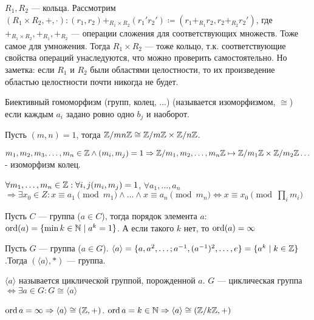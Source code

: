 \begin{definition}
	$R_1, R_2$ --- кольца. Рассмотрим  $(R_1 \times R_2, +, \cdot): (r_1, r_2) +_{R_1\times R_2} (r_1'r_2') \coloneqq (r_1+_{R_1}r_2, r_2+_{R_2}r_2')$, где $+_{R_1\times R_2}, +_{R_1}, +_{R_2}$ --- операции сложения для соответствующих множеств. Тоже самое для умножения. Тогда $R_1 \times R_2$ --- тоже кольцо, т.к. соответствующие свойства операций унаследуются, что можно проверить самостоятельно. Но заметка: если $R_1$ и $R_2$ были областями целостности, то их произведение областью целостности почти никогда не будет.
\end{definition}
\begin{definition}
    Биективный гомоморфизм (групп, колец, ...) (называется изоморфизмом, $\cong$) если каждым $a_i$ задано ровно одно  $b_j$ и наоборот.
\end{definition}
\begin{theorem}
    Пусть $(m, n)=1$, тогда $\mathbb{Z} / mn \mathbb{Z} \cong \mathbb{Z} / m\mathbb{Z} \times \mathbb{Z} / n \mathbb{Z}$.
\end{theorem}
\begin{theorem}[КТО 2]
    $m_1,m_2,m_3,\ldots,m_n \in \mathbb{Z} \land (m_i, m_j) = 1 \Rightarrow \mathbb{Z} / m_1,m_2,\ldots,m_n \mathbb{Z} \mapsto \mathbb{Z} / m_1\mathbb{Z} \times \mathbb{Z} / m_2\mathbb{Z} \ldots$ - изоморфизм колец. 
\end{theorem}
\begin{theorem}
	$\forall m_1, \ldots, m_n \in \mathbb{Z}: \forall i, j (m_i, m_j) = 1$, $\forall a_1, \ldots, a_n$ $\Rightarrow \exists x_0 \in Z: x \equiv a_1 \pmod{m_1} \land \ldots \land x \equiv a_n \pmod{m_n} \iff x \equiv x_0 \pmod {\prod_i m_i}$
\end{theorem}
\begin{definition}
    Пусть $C$ --- группа ($a \in C$), тогда порядок элемента $a$:  $\operatorname{ord}(a) = \{\min k \in \mathbb{N} \mid a^k = 1\}$. А если такого  $k$ нет, то  $\operatorname{ord}(a) = \infty$
\end{definition}
\begin{lemma}
    Пусть $G$ --- группа ($a \in G$). $\langle a \rangle = \{a, a^2,\ldots; a^{-1}, (a^{-1})^2, \ldots, e\} = \{a^k \mid k \in \mathbb{Z}\}$.Тогда $(\langle a \rangle, *)$ --- группа.
\end{lemma}
\begin{definition}
    $\langle a \rangle$ называется циклической группой, порожденной  $a$.  $G$ --- циклическая группа  $ \iff \exists a \in G\!: G \cong \langle a \rangle$
\end{definition}
\begin{theorem}
    $\operatorname{ord} a = \infty \Rightarrow \langle a \rangle \cong (\mathbb{Z}, +)$.  $\operatorname{ord} a = k \in \mathbb{N} \Rightarrow \langle a \rangle \cong (\mathbb{Z} / k\mathbb{Z}, +)$
\end{theorem}

